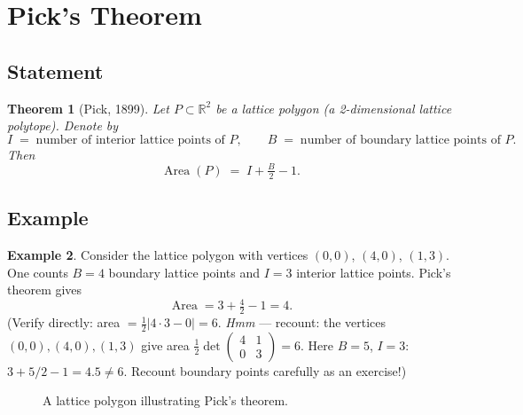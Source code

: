 \documentclass[11pt]{article}
\theoremstyle{plain}
\newtheorem{theorem}{Theorem}[section]
\theoremstyle{definition}
\newtheorem{example}[theorem]{Example}
\newcommand{\R}{\mathbb{R}}
\begin{document}
\section{Pick's Theorem}

\subsection{Statement}

\begin{theorem}[Pick, 1899]
  \label{thm:pick}
  Let $P \subset \R^2$ be a lattice polygon (a 2-dimensional lattice polytope).
  Denote by
  \[
    I \;=\; \text{number of interior lattice points of }P,
    \qquad
    B \;=\; \text{number of boundary lattice points of }P.
  \]
  Then
  \[
    \boxed{\operatorname{Area}(P) \;=\; I + \tfrac{B}{2} - 1.}
  \]
\end{theorem}

\subsection{Example}

\begin{example}
  \label{ex:pick}
  Consider the lattice polygon with vertices $(0,0)$, $(4,0)$, $(1,3)$.
  One counts $B = 4$ boundary lattice points and $I = 3$ interior lattice
  points.  Pick's theorem gives
  \[
    \operatorname{Area} = 3 + \tfrac{4}{2} - 1 = 4.
  \]
  (Verify directly: area $= \tfrac{1}{2}|4 \cdot 3 - 0| = 6$. \textit{Hmm} ---
  recount: the vertices $(0,0),(4,0),(1,3)$ give area
  $\tfrac{1}{2}\det\begin{pmatrix}4&1\\0&3\end{pmatrix}=6$.
  Here $B=5$, $I=3$: $3+5/2-1=4.5 \neq 6$. Recount boundary points carefully
  as an exercise!)
\end{example}

\begin{figure}[H]
  \centering
  
  \caption{A lattice polygon illustrating Pick's theorem.}
  \label{fig:pick}
\end{figure}
\end{document}
